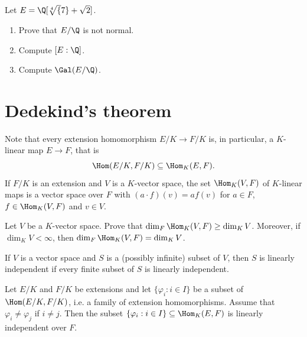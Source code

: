 \begin{exercise}
\label{xca:Q[sqrt[4]{7}+sqrt{2}]}
    Let $E=\Q[\sqrt[4]{7}+\sqrt{2}]$. 
    \begin{enumerate}
        \item Prove that $E/\Q$ is not normal. 
        \item Compute $[E:\Q]$.
        \item Compute $\Gal(E/\Q)$. 
    \end{enumerate}
\end{exercise}


\section{Dedekind's theorem}

Note that every extension homomorphism $E/K\to F/K$ is, in particular, 
a $K$-linear map $E\to F$, that is
\[
\Hom(E/K,F/K)\subseteq\Hom_K(E,F).
\]
If $F/K$ is an extension and $V$ 
is a $K$-vector space, the set
$\Hom_K(V,F)$ of $K$-linear maps
is a vector space over $F$ with
$(a\cdot f)(v)=af(v)$ for $a\in F$, 
$f\in\Hom_K(V,F)$ and $v\in V$. 

\begin{exercise}
\label{xca:dim}
    Let $V$ be a $K$-vector space. 
    Prove that $\dim_F\Hom_K(V,F)\geq\dim_KV$. Moreover, if 
     $\dim_KV<\infty$, then $\dim_F\Hom_K(V,F)=\dim_KV$.
\end{exercise}

If $V$ is a vector space and $S$ is a (possibly infinite) subset of $V$, 
then $S$ is linearly independent if every finite subset of $S$ is linearly independent. 

\begin{theorem}[Dedekind]
Let $E/K$ and $F/K$ be extensions and let 
$\{\varphi_i:i\in I\}$ 
be a subset of
$\Hom(E/K,F/K)$, i.e. a 
family of extension homomorphisms. Assume that 
$\varphi_i\ne \varphi_j$ if $i\ne j$. Then 
the subset $\{\varphi_i:i\in I\}\subseteq\Hom_K(E,F)$ 
is linearly independent over $F$. 
\end{theorem}


